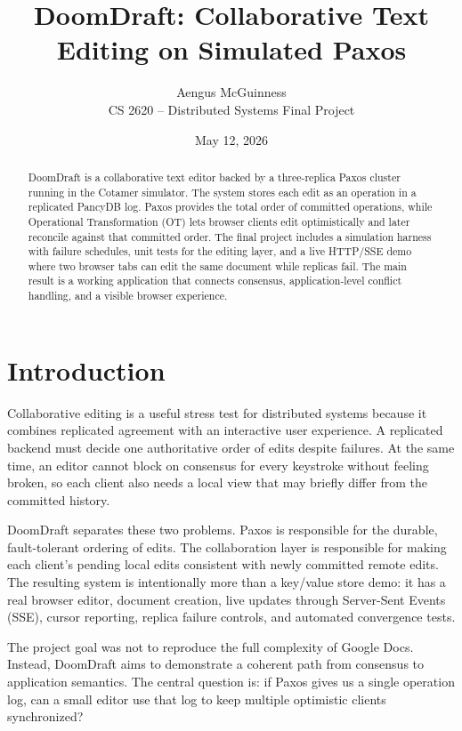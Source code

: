 \documentclass[11pt]{article}
\title{\vspace{-1.4em}\textbf{DoomDraft: Collaborative Text Editing on Simulated Paxos}}
\author{Aengus McGuinness\\[-0.2em]
\small CS 2620 -- Distributed Systems Final Project}
\date{May 12, 2026}
\begin{document}
\maketitle
\vspace{-1.2em}

\begin{abstract}
\noindent
DoomDraft is a collaborative text editor backed by a three-replica Paxos cluster running in the Cotamer simulator. The system stores each edit as an operation in a replicated PancyDB log. Paxos provides the total order of committed operations, while Operational Transformation (OT) lets browser clients edit optimistically and later reconcile against that committed order. The final project includes a simulation harness with failure schedules, unit tests for the editing layer, and a live HTTP/SSE demo where two browser tabs can edit the same document while replicas fail. The main result is a working application that connects consensus, application-level conflict handling, and a visible browser experience.
\end{abstract}

\section{Introduction}

Collaborative editing is a useful stress test for distributed systems because it combines replicated agreement with an interactive user experience. A replicated backend must decide one authoritative order of edits despite failures. At the same time, an editor cannot block on consensus for every keystroke without feeling broken, so each client also needs a local view that may briefly differ from the committed history.

DoomDraft separates these two problems. Paxos is responsible for the durable, fault-tolerant ordering of edits. The collaboration layer is responsible for making each client's pending local edits consistent with newly committed remote edits. The resulting system is intentionally more than a key/value store demo: it has a real browser editor, document creation, live updates through Server-Sent Events (SSE), cursor reporting, replica failure controls, and automated convergence tests.

The project goal was not to reproduce the full complexity of Google Docs. Instead, DoomDraft aims to demonstrate a coherent path from consensus to application semantics. The central question is: if Paxos gives us a single operation log, can a small editor use that log to keep multiple optimistic clients synchronized?
\end{document}
